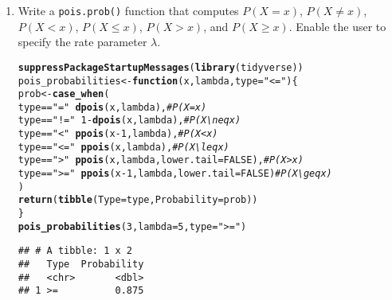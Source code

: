 \documentclass{article}\usepackage[]{graphicx}\usepackage[]{xcolor}
\makeatletter
\newcommand{\hlnum}[1]{\textcolor[rgb]{0.686,0.059,0.569}{#1}}%
\newcommand{\hlsng}[1]{\textcolor[rgb]{0.192,0.494,0.8}{#1}}%
\newcommand{\hlcom}[1]{\textcolor[rgb]{0.678,0.584,0.686}{\textit{#1}}}%
\newcommand{\hlopt}[1]{\textcolor[rgb]{0,0,0}{#1}}%
\newcommand{\hldef}[1]{\textcolor[rgb]{0.345,0.345,0.345}{#1}}%
\newcommand{\hlkwa}[1]{\textcolor[rgb]{0.161,0.373,0.58}{\textbf{#1}}}%
\newcommand{\hlkwb}[1]{\textcolor[rgb]{0.69,0.353,0.396}{#1}}%
\newcommand{\hlkwc}[1]{\textcolor[rgb]{0.333,0.667,0.333}{#1}}%
\newcommand{\hlkwd}[1]{\textcolor[rgb]{0.737,0.353,0.396}{\textbf{#1}}}%
\newenvironment{kframe}{%
 \def\at@end@of@kframe{}%
 \ifinner\ifhmode%
  \def\at@end@of@kframe{\end{minipage}}%
  \begin{minipage}{\columnwidth}%
 \fi\fi%
 \def\FrameCommand##1{\hskip\@totalleftmargin \hskip-\fboxsep
 \colorbox{shadecolor}{##1}\hskip-\fboxsep
     \hskip-\linewidth \hskip-\@totalleftmargin \hskip\columnwidth}%
 \MakeFramed {\advance\hsize-\width
   \@totalleftmargin\z@ \linewidth\hsize
   \@setminipage}}%
 {\par\unskip\endMakeFramed%
 \at@end@of@kframe}
\newenvironment{knitrout}{}{} %
\makeatother
\begin{document}
  \begin{enumerate}
    \item Write a \texttt{pois.prob()} function that computes $P(X=x)$, 
    $P(X \neq x)$, $P(X<x)$, $P(X \leq x)$, $P(X > x)$, and $P(X \geq x).$ Enable the user to specify the rate parameter $\lambda$.
\begin{knitrout}\scriptsize
{}\color{fgcolor}\begin{kframe}
\begin{alltt}
\hlkwd{suppressPackageStartupMessages}\hldef{(}\hlkwd{library}\hldef{(tidyverse))}
\hldef{pois_probabilities} \hlkwb{<-} \hlkwa{function}\hldef{(}\hlkwc{x}\hldef{,} \hlkwc{lambda}\hldef{,} \hlkwc{type} \hldef{=} \hlsng{"<="}\hldef{) \{}
  \hldef{prob} \hlkwb{<-} \hlkwd{case_when}\hldef{(}
    \hldef{type} \hlopt{==} \hlsng{"="}  \hlopt{~} \hlkwd{dpois}\hldef{(x, lambda),}  \hlcom{# P(X = x)}
    \hldef{type} \hlopt{==} \hlsng{"!="} \hlopt{~} \hlnum{1} \hlopt{-} \hlkwd{dpois}\hldef{(x, lambda),}  \hlcom{# P(X \textbackslash{}neq x)}
    \hldef{type} \hlopt{==} \hlsng{"<"}  \hlopt{~} \hlkwd{ppois}\hldef{(x} \hlopt{-} \hlnum{1}\hldef{, lambda),}  \hlcom{# P(X < x)}
    \hldef{type} \hlopt{==} \hlsng{"<="} \hlopt{~} \hlkwd{ppois}\hldef{(x, lambda),}  \hlcom{# P(X \textbackslash{}leq x)}
    \hldef{type} \hlopt{==} \hlsng{">"}  \hlopt{~} \hlkwd{ppois}\hldef{(x, lambda,} \hlkwc{lower.tail} \hldef{=} \hlnum{FALSE}\hldef{),}  \hlcom{# P(X > x)}
    \hldef{type} \hlopt{==} \hlsng{">="} \hlopt{~} \hlkwd{ppois}\hldef{(x} \hlopt{-} \hlnum{1}\hldef{, lambda,} \hlkwc{lower.tail} \hldef{=} \hlnum{FALSE}\hldef{)}  \hlcom{# P(X \textbackslash{}geq x)}
  \hldef{)}
  \hlkwd{return}\hldef{(}\hlkwd{tibble}\hldef{(}\hlkwc{Type} \hldef{= type,} \hlkwc{Probability} \hldef{= prob))}
\hldef{\}}
\hlkwd{pois_probabilities}\hldef{(}\hlnum{3}\hldef{,} \hlkwc{lambda} \hldef{=} \hlnum{5}\hldef{,} \hlkwc{type} \hldef{=} \hlsng{">="}\hldef{)}
\end{alltt}
\begin{verbatim}
## # A tibble: 1 x 2
##   Type  Probability
##   <chr>       <dbl>
## 1 >=          0.875
\end{verbatim}
\end{kframe}
\end{knitrout}

\end{enumerate}
\end{document}
